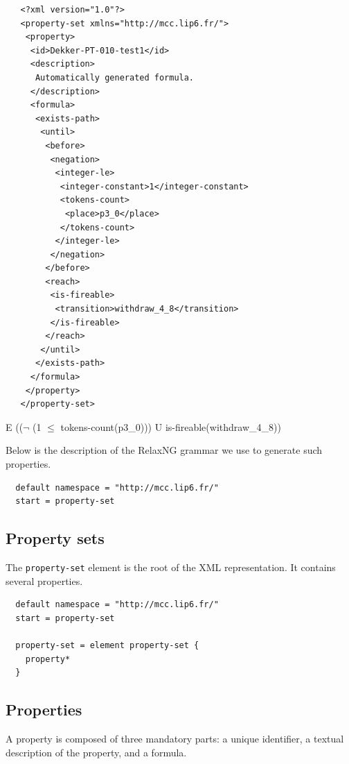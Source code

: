 \documentclass[10pt,english,a4paper]{article}
\begin{document}
\begin{multicols}{2}
\begin{lstlisting}
   <?xml version="1.0"?>
   <property-set xmlns="http://mcc.lip6.fr/">
    <property>
     <id>Dekker-PT-010-test1</id>
     <description>
      Automatically generated formula.
     </description>
     <formula>
      <exists-path>
       <until>
        <before>
         <negation>
          <integer-le>
           <integer-constant>1</integer-constant>
           <tokens-count>
            <place>p3_0</place>
           </tokens-count>
          </integer-le>
         </negation>
        </before>
        <reach>
         <is-fireable>
          <transition>withdraw_4_8</transition>
         </is-fireable>
        </reach>
       </until>
      </exists-path>
     </formula>
    </property>
   </property-set>
\end{lstlisting}
\columnbreak
\footnotesize
\vspace*{2cm}
E (($\lnot$ (1 $\leq$ tokens-count(p3\_0))) U is-fireable(withdraw\_4\_8))
\end{multicols}

Below is the description of the RelaxNG grammar we use to generate such properties.


\begin{lstlisting}
  default namespace = "http://mcc.lip6.fr/"
  start = property-set
\end{lstlisting}
\subsection{Property sets}
The \lstinline[language=xsd]!property-set! element is the root of the XML representation.
It contains several properties.
\begin{lstlisting}
  default namespace = "http://mcc.lip6.fr/"
  start = property-set

  property-set = element property-set {
    property*
  }
\end{lstlisting}

\subsection{Properties}
A property is composed of three mandatory parts: a unique identifier, a textual description
of the property, and a formula.
\end{document}
